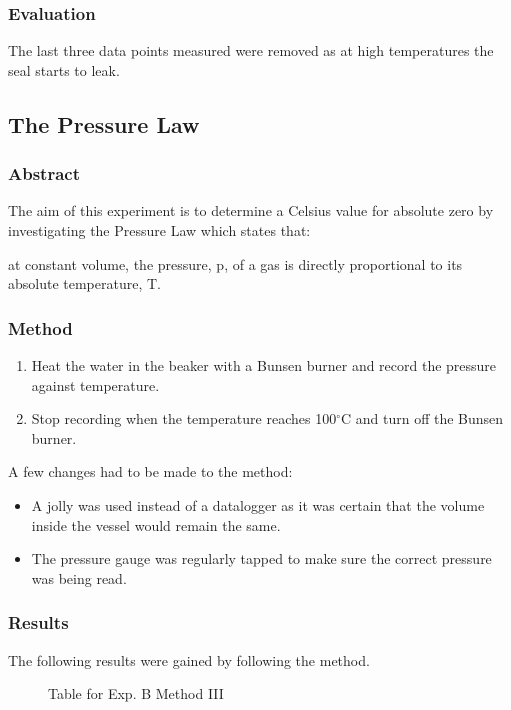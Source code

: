 \subsubsection{Evaluation}
The last three data points measured were removed as at high temperatures the seal starts to leak.

\subsection{The Pressure Law}

\subsubsection{Abstract}
The aim of this experiment is to determine a Celsius value for absolute zero by investigating the Pressure Law which states that:
\begin{quoting}
  at constant volume, the pressure, p, of a gas is directly proportional to its absolute temperature, T.
\end{quoting}

\subsubsection{Method}
\begin{enumerate}
  \item Heat the water in the beaker with a Bunsen burner and record the pressure against temperature.
  \item Stop recording when the temperature reaches 100$^\circ$C and turn off the Bunsen burner.
\end{enumerate}
A few changes had to be made to the method:
\begin{itemize}
  \item A jolly was used instead of a datalogger as it was certain that the volume inside the vessel would remain the same.
  \item The pressure gauge was regularly tapped to make sure the correct pressure was being read.
\end{itemize}

\subsubsection{Results}
The following results were gained by following the method.
\begin{figure}
  \centering
  \caption{Table for Exp. B Method III}
\end{figure}

